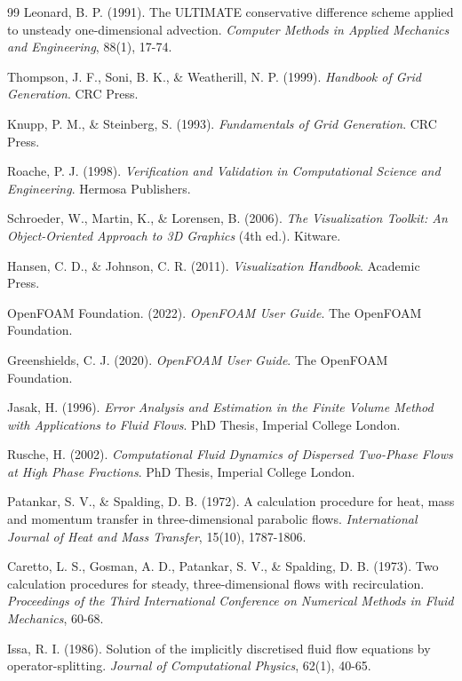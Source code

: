 \begin{thebibliography}{99}
Leonard, B. P. (1991). The ULTIMATE conservative difference scheme applied to unsteady one-dimensional advection. \emph{Computer Methods in Applied Mechanics and Engineering}, 88(1), 17-74.

Thompson, J. F., Soni, B. K., \& Weatherill, N. P. (1999). \emph{Handbook of Grid Generation}. CRC Press.

Knupp, P. M., \& Steinberg, S. (1993). \emph{Fundamentals of Grid Generation}. CRC Press.

Roache, P. J. (1998). \emph{Verification and Validation in Computational Science and Engineering}. Hermosa Publishers.

Schroeder, W., Martin, K., \& Lorensen, B. (2006). \emph{The Visualization Toolkit: An Object-Oriented Approach to 3D Graphics} (4th ed.). Kitware.

Hansen, C. D., \& Johnson, C. R. (2011). \emph{Visualization Handbook}. Academic Press.

OpenFOAM Foundation. (2022). \emph{OpenFOAM User Guide}. The OpenFOAM Foundation.

Greenshields, C. J. (2020). \emph{OpenFOAM User Guide}. The OpenFOAM Foundation.

Jasak, H. (1996). \emph{Error Analysis and Estimation in the Finite Volume Method with Applications to Fluid Flows}. PhD Thesis, Imperial College London.

Rusche, H. (2002). \emph{Computational Fluid Dynamics of Dispersed Two-Phase Flows at High Phase Fractions}. PhD Thesis, Imperial College London.

Patankar, S. V., \& Spalding, D. B. (1972). A calculation procedure for heat, mass and momentum transfer in three-dimensional parabolic flows. \emph{International Journal of Heat and Mass Transfer}, 15(10), 1787-1806.

Caretto, L. S., Gosman, A. D., Patankar, S. V., \& Spalding, D. B. (1973). Two calculation procedures for steady, three-dimensional flows with recirculation. \emph{Proceedings of the Third International Conference on Numerical Methods in Fluid Mechanics}, 60-68.

Issa, R. I. (1986). Solution of the implicitly discretised fluid flow equations by operator-splitting. \emph{Journal of Computational Physics}, 62(1), 40-65.


\end{thebibliography}
